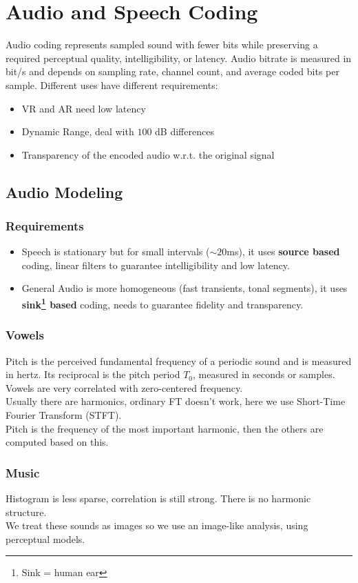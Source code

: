 \section{Audio and Speech Coding}
Audio coding represents sampled sound with fewer bits while preserving a required perceptual quality, intelligibility, or latency. Audio bitrate is measured in bit/s and depends on sampling rate, channel count, and average coded bits per sample.
Different uses have different requirements:
\begin{itemize}
    \item VR and AR need low latency
    \item Dynamic Range, deal with $100$ dB differences
    \item Transparency of the encoded audio w.r.t. the original signal
\end{itemize}
\subsection{Audio Modeling}
\subsubsection{Requirements}
\begin{itemize}
    \item Speech is stationary but for small intervals ($\sim 20$ms), it uses \textbf{source based} coding, linear filters to guarantee intelligibility and low latency.
    \item General Audio is more homogeneous (fast transients, tonal segments), it uses \textbf{sink\footnote{Sink = human ear} based} coding, needs to guarantee fidelity and transparency.
\end{itemize}
\subsubsection{Vowels}
Pitch is the perceived fundamental frequency of a periodic sound and is measured in hertz. Its reciprocal is the pitch period $T_0$, measured in seconds or samples.
Vowels are very correlated with zero-centered frequency.\\
Usually there are harmonics, ordinary FT doesn't work, here we use Short-Time Fourier Transform (STFT).\\
Pitch is the frequency of the most important harmonic, then the others are computed based on this.
\subsubsection{Music}
Histogram is less sparse, correlation is still strong. There is no harmonic structure.\\
We treat these sounds as images so we use an image-like analysis, using perceptual models.
